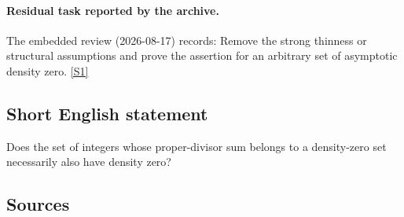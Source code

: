 \documentclass[11pt,a4paper]{article}
\newcommand{\sref}[2]{\hyperlink{source:#1:#2}{[S#2]}}
\begin{document}
\paragraph{Residual task reported by the archive.}

The embedded review (2026-08-17) records: Remove the strong thinness or structural assumptions and prove the assertion for an arbitrary set of asymptotic density zero. \sref{2407}{1}

\subsection{Short English statement}

Does the set of integers whose proper-divisor sum belongs to a density-zero set necessarily also have density zero?

\subsection{Sources}
\end{document}
